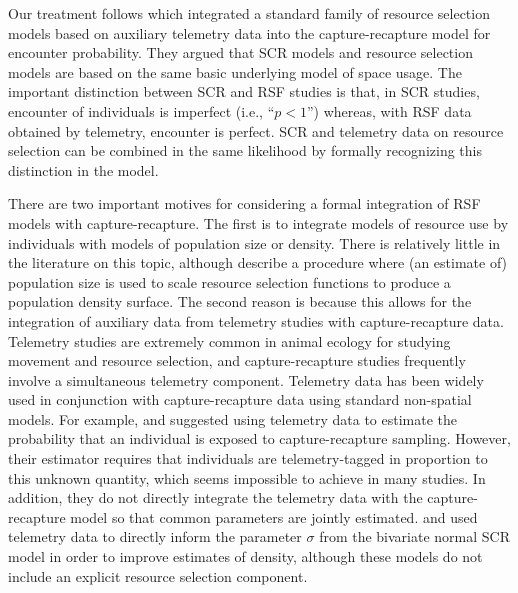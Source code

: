 Our treatment follows
\citet{royle_etal:2012mee} which integrated a standard family of
resource selection models based on auxiliary telemetry data into the
capture-recapture model for encounter probability.
They  argued that SCR models and resource
selection models \citep{manly_etal:2002} are based on the same basic
underlying model of space usage. The important distinction between SCR
and RSF studies is that, in SCR studies, encounter of individuals is
imperfect (i.e., ``$p<1$'') whereas, with RSF data obtained by
telemetry, encounter is perfect. 
SCR and telemetry data on resource selection can be combined in the
same likelihood by formally recognizing this distinction in the model.  

There are two important motives for considering a formal integration
of RSF models with capture-recapture. The first is to integrate models
of resource use by individuals with models of population size or
density. There is relatively little in the literature on this topic,
although \citet{boyce_mcdonald:1999} describe a procedure where (an
estimate of) population size is used to scale resource selection
functions to produce a population density surface. The second reason is because
this allows for the integration of auxiliary data from telemetry
studies with capture-recapture data.  Telemetry studies are extremely
common in animal ecology for studying movement and resource selection,
and capture-recapture studies frequently involve a simultaneous
telemetry component.  Telemetry data has been widely used in
conjunction with capture-recapture data using standard non-spatial
models.  For example, \citet{white_shenk:2001} and \citet{ivan:2012}
suggested using telemetry data to estimate the probability that an
individual is exposed to capture-recapture sampling. However, their estimator requires
that individuals are telemetry-tagged in proportion to this unknown quantity,
which seems impossible to achieve in many studies. In addition, they
do not directly integrate the telemetry data with the
capture-recapture model so that common parameters are jointly
estimated.  \citet{sollmann_etal:inprepjapplecol} and
\citet{sollmann_etal:2012ecol} used telemetry data to directly inform
the parameter $\sigma$ from the bivariate normal SCR model in order to
improve estimates of density, although these models do not include an
explicit resource selection component.

